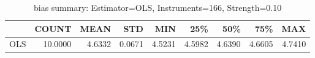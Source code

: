 \begin{table}[ht]
\centering
\caption{bias summary: Estimator=OLS, Instruments=166, Strength=0.10}
\begin{tabular}{lrrrrrrrr}
\toprule
 & COUNT & MEAN & STD & MIN & 25\% & 50\% & 75\% & MAX \\
\midrule
OLS & 10.0000 & 4.6332 & 0.0671 & 4.5231 & 4.5982 & 4.6390 & 4.6605 & 4.7410 \\
\bottomrule
\end{tabular}
\end{table}
